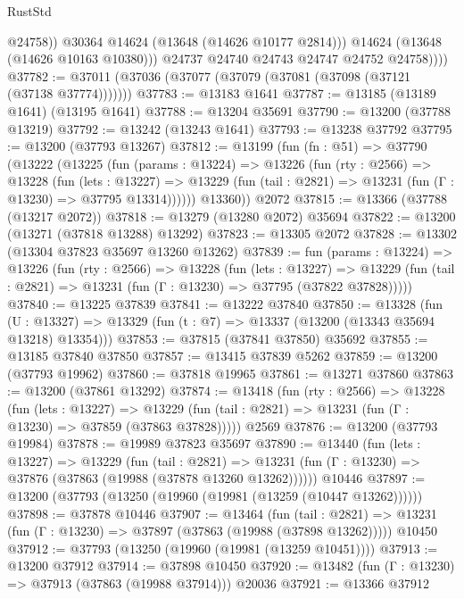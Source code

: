 \begin{lexlean}{RustStd}
\begin{coremodule}
                    @24758))
                @30364
                @14624
                (@13648 (@14626 @10177 @2814)))
              @14624
              (@13648 (@14626 @10163 @10380)))
            @24737
            @24740
            @24743
            @24747
            @24752
            @24758))))
@37782 := @37011 (@37036 (@37077 (@37079 (@37081 (@37098 (@37121 (@37138 @37774)))))))
@37783 := @13183 @1641
@37787 := @13185 (@13189 @1641) (@13195 @1641)
@37788 := @13204 @35691
@37790 := @13200 (@37788 @13219)
@37792 := @13242 (@13243 @1641)
@37793 := @13238 @37792
@37795 := @13200 (@37793 @13267)
@37812 := @13199
    (fun (fn : @51) =>
    @37790
      (@13222
        (@13225
          (fun (params : @13224) =>
          @13226
            (fun (rty : @2566) =>
            @13228
              (fun (lets : @13227) =>
              @13229 (fun (tail : @2821) => @13231 (fun (Γ : @13230) => @37795 @13314))))))
        @13360))
    @2072
@37815 := @13366 (@37788 (@13217 @2072))
@37818 := @13279 (@13280 @2072) @35694
@37822 := @13200 (@13271 (@37818 @13288) @13292)
@37823 := @13305 @2072
@37828 := @13302 (@13304 @37823 @35697 @13260 @13262)
@37839 := fun (params : @13224) =>
  @13226
    (fun (rty : @2566) =>
    @13228
      (fun (lets : @13227) =>
      @13229 (fun (tail : @2821) => @13231 (fun (Γ : @13230) => @37795 (@37822 @37828)))))
@37840 := @13225 @37839
@37841 := @13222 @37840
@37850 := @13328
    (fun (U : @13327) => @13329 (fun (t : @7) => @13337 (@13200 (@13343 @35694 @13218) @13354)))
@37853 := @37815 (@37841 @37850) @35692
@37855 := @13185 @37840 @37850
@37857 := @13415 @37839 @5262
@37859 := @13200 (@37793 @19962)
@37860 := @37818 @19965
@37861 := @13271 @37860
@37863 := @13200 (@37861 @13292)
@37874 := @13418
    (fun (rty : @2566) =>
    @13228
      (fun (lets : @13227) =>
      @13229 (fun (tail : @2821) => @13231 (fun (Γ : @13230) => @37859 (@37863 @37828)))))
    @2569
@37876 := @13200 (@37793 @19984)
@37878 := @19989 @37823 @35697
@37890 := @13440
    (fun (lets : @13227) =>
    @13229
      (fun (tail : @2821) =>
      @13231 (fun (Γ : @13230) => @37876 (@37863 (@19988 (@37878 @13260 @13262))))))
    @10446
@37897 := @13200 (@37793 (@13250 (@19960 (@19981 (@13259 (@10447 @13262))))))
@37898 := @37878 @10446
@37907 := @13464
    (fun (tail : @2821) => @13231 (fun (Γ : @13230) => @37897 (@37863 (@19988 (@37898 @13262)))))
    @10450
@37912 := @37793 (@13250 (@19960 (@19981 (@13259 @10451))))
@37913 := @13200 @37912
@37914 := @37898 @10450
@37920 := @13482 (fun (Γ : @13230) => @37913 (@37863 (@19988 @37914))) @20036
@37921 := @13366 @37912

\end{coremodule}
\end{lexlean}
